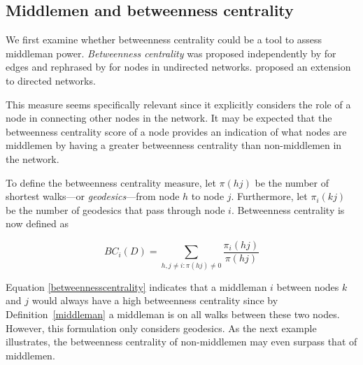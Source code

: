 \documentclass[11pt,fleqn]{article}
\begin{document}
\subsection{Middlemen and betweenness centrality}

We first examine whether betweenness centrality could be a tool to assess middleman power. \emph{Betweenness centrality} was proposed independently by \citet{Anthonisse1971} for edges and rephrased by \citet{Freeman1977} for nodes in undirected networks. \citet{White1994} proposed an extension to directed networks.

This measure seems specifically relevant since it explicitly considers the role of a node in connecting other nodes in the network. It may be expected that the betweenness centrality score of a node provides an indication of what nodes are middlemen by having a greater betweenness centrality than non-middlemen in the network.

To define the betweenness centrality measure, let $\pi(hj)$ be the number of shortest walks---or \emph{geodesics}---from node $h$ to node $j$. Furthermore, let $\pi_{i}(kj)$ be the number of geodesics that pass through node $i$. Betweenness centrality is now defined as

\begin{equation} \label{betweennesscentrality}
BC_{i}(D) = \sum_{h,j \neq i \colon \pi(hj) \neq 0} \frac{\pi_{i}(hj)}{\pi(hj)}
\end{equation}

Equation \ref{betweennesscentrality} indicates that a middleman $i$ between nodes $k$ and $j$ would always have a high betweenness centrality since by Definition~\ref{middleman} a middleman is on all walks between these two nodes. However, this formulation only considers geodesics. As the next example illustrates, the betweenness centrality of non-middlemen may even surpass that of middlemen.
\end{document}
